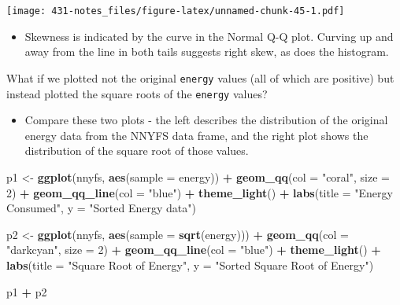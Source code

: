\documentclass[
]{book}
\newenvironment{Shaded}{\begin{snugshade}}{\end{snugshade}}
\newcommand{\DataTypeTok}[1]{\textcolor[rgb]{0.13,0.29,0.53}{#1}}
\newcommand{\DecValTok}[1]{\textcolor[rgb]{0.00,0.00,0.81}{#1}}
\newcommand{\KeywordTok}[1]{\textcolor[rgb]{0.13,0.29,0.53}{\textbf{#1}}}
\newcommand{\NormalTok}[1]{#1}
\newcommand{\OperatorTok}[1]{\textcolor[rgb]{0.81,0.36,0.00}{\textbf{#1}}}
\newcommand{\StringTok}[1]{\textcolor[rgb]{0.31,0.60,0.02}{#1}}
\providecommand{\tightlist}{%
  \setlength{\itemsep}{0pt}\setlength{\parskip}{0pt}}
\begin{document}
\texttt{[image: 431-notes\_files/figure-latex/unnamed-chunk-45-1.pdf]}

\begin{itemize}
\tightlist
\item
  Skewness is indicated by the curve in the Normal Q-Q plot. Curving up and away from the line in both tails suggests right skew, as does the histogram.
\end{itemize}

What if we plotted not the original \texttt{energy} values (all of which are positive) but instead plotted the square roots of the \texttt{energy} values?

\begin{itemize}
\tightlist
\item
  Compare these two plots - the left describes the distribution of the original energy data from the NNYFS data frame, and the right plot shows the distribution of the square root of those values.
\end{itemize}

\begin{Shaded}
\begin{Highlighting}[]
\NormalTok{p1 <-}\StringTok{ }\KeywordTok{ggplot}\NormalTok{(nnyfs, }\KeywordTok{aes}\NormalTok{(}\DataTypeTok{sample =}\NormalTok{ energy)) }\OperatorTok{+}
\StringTok{    }\KeywordTok{geom_qq}\NormalTok{(}\DataTypeTok{col =} \StringTok{"coral"}\NormalTok{, }\DataTypeTok{size =} \DecValTok{2}\NormalTok{) }\OperatorTok{+}\StringTok{ }
\StringTok{    }\KeywordTok{geom_qq_line}\NormalTok{(}\DataTypeTok{col =} \StringTok{"blue"}\NormalTok{) }\OperatorTok{+}
\StringTok{    }\KeywordTok{theme_light}\NormalTok{() }\OperatorTok{+}
\StringTok{    }\KeywordTok{labs}\NormalTok{(}\DataTypeTok{title =} \StringTok{"Energy Consumed"}\NormalTok{,}
         \DataTypeTok{y =} \StringTok{"Sorted Energy data"}\NormalTok{)}

\NormalTok{p2 <-}\StringTok{ }\KeywordTok{ggplot}\NormalTok{(nnyfs, }\KeywordTok{aes}\NormalTok{(}\DataTypeTok{sample =} \KeywordTok{sqrt}\NormalTok{(energy))) }\OperatorTok{+}
\StringTok{    }\KeywordTok{geom_qq}\NormalTok{(}\DataTypeTok{col =} \StringTok{"darkcyan"}\NormalTok{, }\DataTypeTok{size =} \DecValTok{2}\NormalTok{) }\OperatorTok{+}\StringTok{ }
\StringTok{    }\KeywordTok{geom_qq_line}\NormalTok{(}\DataTypeTok{col =} \StringTok{"blue"}\NormalTok{) }\OperatorTok{+}
\StringTok{    }\KeywordTok{theme_light}\NormalTok{() }\OperatorTok{+}
\StringTok{    }\KeywordTok{labs}\NormalTok{(}\DataTypeTok{title =} \StringTok{"Square Root of Energy"}\NormalTok{,}
         \DataTypeTok{y =} \StringTok{"Sorted Square Root of Energy"}\NormalTok{)}

\NormalTok{p1 }\OperatorTok{+}\StringTok{ }\NormalTok{p2}
\end{Highlighting}
\end{Shaded}
\end{document}

